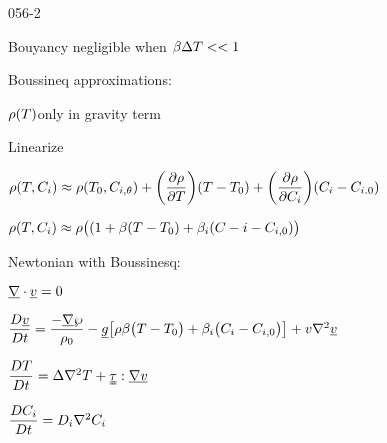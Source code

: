 \begin{mitframe}{056-2}
    
\begin{listone}
		\item Bouyancy negligible when $\texpcoeff\iipf\Temp<<1$
        \item Boussineq approximations:
        	\begin{listtwo}
            	\item $ \dens(\Temp)$only in gravity term
                \item Linearize
                	\begin{listthree}
                    	\item $\dens(\Temp,\conc_{\state})\approx\dens(\Temp_{0},\conc_{\state,\theta})+\bigg(\dfrac{\partial\dens}{\partial\Temp}\bigg)(\Temp-\Temp_{0})+\bigg(\dfrac{\partial\dens}{\partial\conc_{\state}}\bigg)(\conc_{\state}-\conc_{\state.0})$
                        \item $\dens(\Temp,\conc_{\state})\approx\dens\big((1+\texpcoeff(\Temp-\Temp_{0})+\sexcoeff(\conc-{\state}-\conc_{\state,0})\big)$
                    \end{listthree}
            \end{listtwo}
\item Newtonian with Boussinesq:
		\begin{listtwo}
        		\item $\gradop\cdot\uline{\vvel}=0$
                \item$\dfrac{\elecdisplace\uline{\vvel}}{\elecdisplace{t}}=\dfrac{-\gradop\dynpress}{\dens_{0}}-\uline{\grav}\big[\dens\texpcoeff\big(\Temp-\Temp_{0}\big)+\sexcoeff\big(\conc_{\state}-\conc_{\state,0}\big)\big]+\vvel\nabla^2\uline{\vvel}$
                \item $\dfrac{\elecdisplace\Temp}{\elecdisplace{t}}=\iipf\nabla^2\Temp+\uuline{\torque}:\gradop\uline{\vvel}$
                \item $\dfrac{\elecdisplace\conc_{\state}}{\elecdisplace{t}}=\pdiff\nabla^2\conc_{\state}$
        \end{listtwo}
\end{listone}
\end{mitframe}